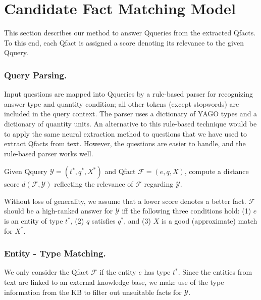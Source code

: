 \section{Candidate Fact Matching Model} 
\label{sec:match}
This section describes our method to answer Qqueries from the extracted Qfacts. To this end, each Qfact is assigned a score denoting its relevance to the given Qquery.

\subsubsection{Query Parsing.} 
Input questions are mapped into Qqueries by a rule-based parser for recognizing answer type and quantity condition; all other tokens (except stopwords) are included in the query context. The parser uses a dictionary of YAGO types and a dictionary of quantity units. An alternative to this rule-based technique would be to apply the same neural extraction method to questions that we have used to extract Qfacts from text. However, the questions are easier to handle, and the rule-based parser works well. 

\begin{task} Given Qquery $\mathcal{Y} = (t^*,q^*,X^*)$ and Qfact $\mathcal{F} = (e,q,X)$, compute a distance score $d(\mathcal{F}, \mathcal{Y})$ reflecting the relevance of $\mathcal{F}$ regarding $\mathcal{Y}$.
\end{task}
Without loss of generality, we assume that a lower score denotes a better fact.
$\mathcal{F}$ should be a high-ranked answer for $\mathcal{Y}$ iff the following three conditions hold:
(1) $e$ is an entity of type $t^*$, 
(2) $q$ satisfies $q^*$, and (3) $X$ is a good (approximate) match for $X^*$.

\subsubsection{Entity - Type Matching.} We only consider the Qfact $\mathcal{F}$ if the entity $e$ has type $t^*$. Since the entities from text are linked to an external knowledge base, we make use of the type information from the KB to filter out unsuitable facts for $\mathcal{Y}$. %

